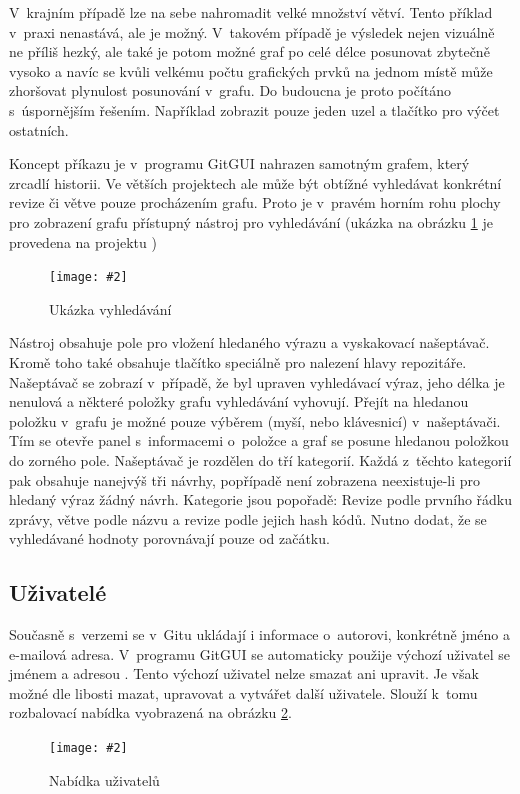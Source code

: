 \documentclass[
  biblatex,
  glossaries,
  index
]{kidiplom}
\newcommand{\pic}[4]{
\begin{figure}[h]
\centering
\texttt{[image: \#2]}
\caption{#3}
\label{fig:#4}
\end{figure}}
\begin{document}
V~krajním případě lze na sebe nahromadit velké množství větví. Tento příklad v~praxi nenastává, ale je možný. V~takovém případě je výsledek nejen vizuálně ne příliš hezký, ale také je potom možné graf po celé délce posunovat zbytečně vysoko a navíc se kvůli velkému počtu grafických prvků na jednom místě může zhoršovat plynulost posunování v~grafu. Do budoucna je proto počítáno s~úspornějším řešením. Například zobrazit pouze jeden uzel a tlačítko pro výčet ostatních.

Koncept příkazu  je v~programu GitGUI nahrazen samotným grafem, který zrcadlí historii. Ve větších projektech ale může být obtížné vyhledávat konkrétní revize či větve pouze procházením grafu. Proto je v~pravém horním rohu plochy pro zobrazení grafu přístupný nástroj pro vyhledávání (ukázka na obrázku \ref{fig:searchtool} je provedena na projektu \cite{libgitreference})

\pic{10cm}{searchbar.png}{Ukázka vyhledávání}{searchtool}

Nástroj obsahuje pole pro vložení hledaného výrazu a vyskakovací našeptávač. Kromě toho také obsahuje tlačítko speciálně pro nalezení hlavy repozitáře. Našeptávač se zobrazí v~případě, že byl upraven vyhledávací výraz, jeho délka je nenulová a některé položky grafu vyhledávání vyhovují. Přejít na hledanou položku v~grafu je možné pouze výběrem (myší, nebo klávesnicí) v~našeptávači. Tím se otevře panel s~informacemi o~položce a graf se posune hledanou položkou do zorného pole. Našeptávač je rozdělen do tří kategorií. Každá z~těchto kategorií pak obsahuje nanejvýš tři návrhy, popřípadě není zobrazena neexistuje-li pro hledaný výraz žádný návrh. Kategorie jsou popořadě: Revize podle prvního řádku zprávy, větve podle názvu a revize podle jejich hash kódů. Nutno dodat, že se vyhledávané hodnoty porovnávají pouze od začátku.

\subsection{Uživatelé}
Současně s~verzemi se v~Gitu ukládají i informace o~autorovi, konkrétně jméno a e-mailová adresa. V~programu GitGUI se automaticky použije výchozí uživatel se jménem  a adresou \uv{-}. Tento výchozí uživatel nelze smazat ani upravit. Je však možné dle libosti mazat, upravovat a vytvářet další uživatele. Slouží k~tomu rozbalovací nabídka vyobrazená na obrázku \ref{fig:users}.

\pic{10cm}{users.png}{Nabídka uživatelů}{users}
\end{document}
